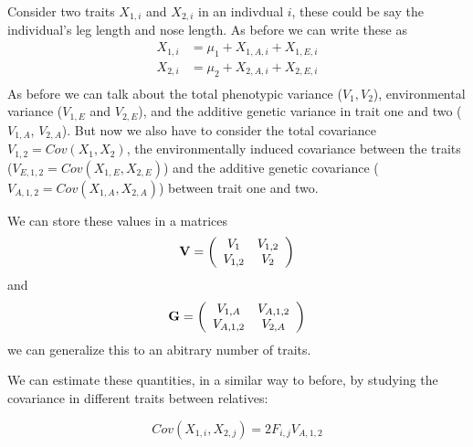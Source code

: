 Consider two traits $X_{1,i}$ and $X_{2,i}$ in an indivdual $i$, these could be
say the individual's leg length and nose length. As before we can write
these as 
\begin{eqnarray}
X_{1,i} &= \mu_1+ X_{1,A,i} + X_{1,E,i}  \nonumber \\
X_{2,i} &= \mu_2 +X_{2,A,i} + X_{2,E,i} \nonumber \\
\end{eqnarray}
As before we can talk about the total phenotypic variance ($V_1,V_2$),
environmental variance  ($V_{1,E}$ and $V_{2,E}$), and the additive genetic variance in trait one and two
($V_{1,A}$, $V_{2,A}$). But now we also have to consider the 
total covariance $V_{1,2}=Cov(X_{1},X_{2})$, the environmentally induced covariance between the traits ($V_{E,1,2}=Cov(X_{1,E}
,X_{2,E} )$) and the additive genetic covariance ($V_{A,1,2}
=Cov(X_{1,A} ,X_{2,A} )$) between trait one and two.

We can store these values in a matrices 
\begin{equation}
\bf{V}= \left( \begin{array}{cc} 
V_{1} & V_{1,2} \\
V_{1,2} & V_{2} \\
\end{array} \right) \label{P_matrix}
\end{equation}
and
\begin{equation}
\bf{G}= \left( \begin{array}{cc} 
V_{1,A} & V_{A,1,2} \\
V_{A,1,2} & V_{2,A} \\
\end{array} \right)  \label{G_matrix}
\end{equation}
we can generalize this to an abitrary number of traits.

We can estimate these quantities, in a similar way to before, by
studying the covariance in different traits between relatives: 

\begin{equation}
Cov(X_{1,i},X_{2,j}) = 2 F_{i,j} V_{A,1,2}
\end{equation}

